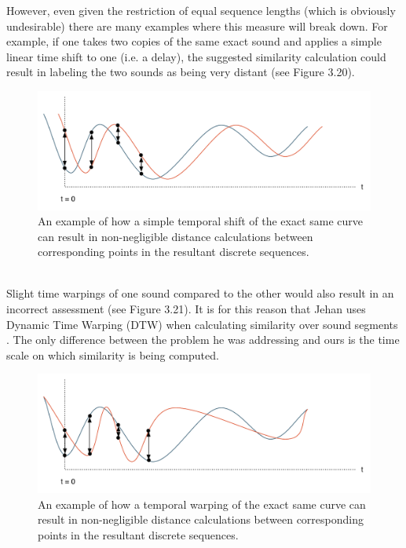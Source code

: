 \documentclass[a4paper,12pt]{report} 	%
\numberwithin{figure}{chapter}
\numberwithin{table}{chapter}
\numberwithin{equation}{chapter}
\begin{document}
\begin{flushleft}
However, even given the restriction of equal sequence lengths (which is obviously undesirable) there are many examples where this measure will break down. For example, if one takes two copies of the same exact sound and applies a simple linear time shift to one (i.e. a delay), the suggested similarity calculation could result in labeling the two sounds as being very distant (see Figure 3.20).
\begin{figure}[h!]
\begin{center}
\includegraphics[scale=0.6]{TimbreDistance3}
\caption[Timbre Distance Between Time-Shifted Curves]{An example of how a simple temporal shift of the exact same curve can result in non-negligible distance calculations between corresponding points in the resultant discrete sequences.}
\end{center}
\end{figure}
\\
Slight time warpings of one sound compared to the other would also result in an incorrect assessment (see Figure 3.21). It is for this reason that Jehan uses Dynamic Time Warping (DTW) when calculating similarity over sound segments \cite{Jehan:2005fy}. The only difference between the problem he was addressing and ours is the time scale on which similarity is being computed.
\begin{figure}[h!]
\begin{center}
\includegraphics[scale=0.6]{TimbreDistance4}
\caption[Timbre Distance Between Time-Warped Curves]{An example of how a temporal warping of the exact same curve can result in non-negligible distance calculations between corresponding points in the resultant discrete sequences.}

\end{center}
\end{figure}
\end{flushleft}
\end{document}
